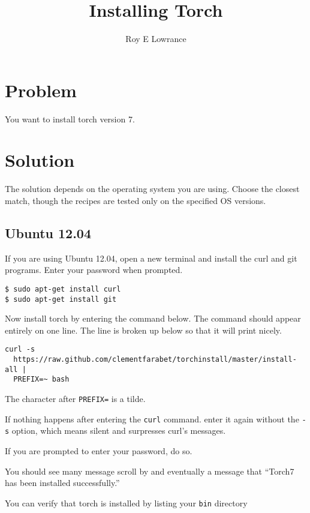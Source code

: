 \documentclass{article}
\let\code\texttt %
\begin{document}
\title{Installing Torch}
\author{Roy E Lowrance}
\maketitle


\section{Problem}
You want to install torch version 7.

\section{Solution}

The solution depends on the operating system you are using. Choose the
closest match, though the recipes are tested only on the specified OS
versions.

\subsection{Ubuntu 12.04}

If you are using Ubuntu 12.04, open a new terminal and install the curl
and git
programs. Enter your password when prompted.

\begin{verbatim}
$ sudo apt-get install curl
$ sudo apt-get install git
\end{verbatim}

Now install torch by entering the command below. The command should
appear entirely on one line. The line is broken up below so that it will
print nicely.

\begin{verbatim}
curl -s
  https://raw.github.com/clementfarabet/torchinstall/master/install-all | 
  PREFIX=~ bash
\end{verbatim}

The character after \code{PREFIX=} is a tilde.

If nothing happens after entering the \code{curl} command. enter it
again without the \code{-s} option, which means silent and surpresses
curl's messages.

If you are prompted to enter your password, do so.

You should see many message scroll by and eventually a message that ``Torch7 has
been installed successfully.''

You can verify that torch is installed by listing your \code{bin} directory
\end{document}
